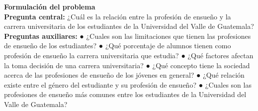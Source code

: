 	\textbf{Formulación del problema}\\
	
	\textbf{Pregunta central:} ¿Cuál es la relación entre la profesión de ensueño y la carrera universitaria de los estudiantes de la Universidad del Valle de Guatemala?\\
	
	\textbf{Preguntas auxiliares:}
	●	¿Cuales son las limitaciones que tienen las profesiones de ensueño de los estudiantes?
	●	¿Qué porcentaje de alumnos tienen como profesión de ensueño la carrera universitaria que estudia?
	●	¿Qué factores afectan la toma decisión de una carrera universitaria?
	●	¿Qué concepto tiene la sociedad acerca de las profesiones de ensueño de los jóvenes en general?
	●	¿Qué relación existe entre el género del estudiante y su profesión de ensueño?
	●	¿Cuales son las profesiones de ensueño más comunes entre los estudiantes de la Universidad del Valle de Guatemala?
	

